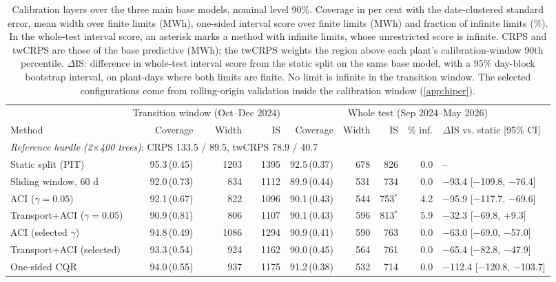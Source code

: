\begin{table}[tp]
\centering
\footnotesize
\caption{Calibration layers over the three main base models, nominal level 90\%. Coverage in per cent with the date-clustered standard error, mean width over finite limits (MWh), one-sided interval score over finite limits (MWh) and fraction of infinite limits (\%). In the whole-test interval score, an asterisk marks a method with infinite limits, whose unrestricted score is infinite. CRPS and twCRPS are those of the base predictive (MWh); the twCRPS weights the region above each plant's calibration-window 90th percentile. $\Delta$IS: difference in whole-test interval score from the static split on the same base model, with a 95\% day-block bootstrap interval, on plant-days where both limits are finite. No limit is infinite in the transition window. The selected configurations come from rolling-origin validation inside the calibration window (\ref{app:hiper}).}
\label{tab:modelos}
\setlength{\tabcolsep}{4pt}
\begin{tabular}{l rrr rrrrl}
\toprule
 & \multicolumn{3}{c}{Transition window (Oct--Dec 2024)} & \multicolumn{5}{c}{Whole test (Sep 2024--May 2026)} \\
\cmidrule(lr){2-4}\cmidrule(lr){5-9}
Method & Coverage & Width & IS & Coverage & Width & IS & \% inf. & $\Delta$IS vs. static [95\% CI] \\
\midrule
\multicolumn{9}{l}{\textit{Reference hurdle (2$\times$400 trees)}: CRPS 133.5 / 89.5, twCRPS 78.9 / 40.7} \\
\quad Static split (PIT) & 95.3\,(0.45) & 1203 & 1395 & 92.5\,(0.37) & 678 & 826 & 0.0 & -- \\
\quad Sliding window, 60 d & 92.0\,(0.73) & 834 & 1112 & 89.9\,(0.44) & 531 & 734 & 0.0 & $-$93.4 [$-$109.8, $-$76.4] \\
\quad ACI ($\gamma=0.05$) & 92.1\,(0.67) & 822 & 1096 & 90.1\,(0.43) & 544 & 753$^\ast$ & 4.2 & $-$95.9 [$-$117.7, $-$69.6] \\
\quad Transport+ACI ($\gamma=0.05$) & 90.9\,(0.81) & 806 & 1107 & 90.1\,(0.43) & 596 & 813$^\ast$ & 5.9 & $-$32.3 [$-$69.8, +9.3] \\
\quad ACI (selected $\gamma$) & 94.8\,(0.49) & 1086 & 1294 & 90.9\,(0.41) & 590 & 763 & 0.0 & $-$63.0 [$-$69.0, $-$57.0] \\
\quad Transport+ACI (selected) & 93.3\,(0.54) & 924 & 1162 & 90.0\,(0.45) & 564 & 761 & 0.0 & $-$65.4 [$-$82.8, $-$47.9] \\
\quad One-sided CQR & 94.0\,(0.55) & 937 & 1175 & 91.2\,(0.38) & 532 & 714 & 0.0 & $-$112.4 [$-$120.8, $-$103.7] \\

\end{tabular}
\end{table}
